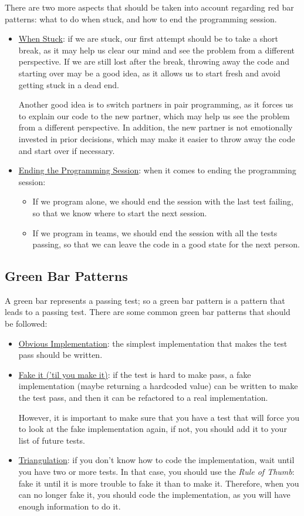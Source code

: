 There are two more aspects that should be taken into account regarding red bar patterns: what to do when stuck, and how to end the programming session.
\begin{itemize}
    \item \ul{When Stuck}: if we are stuck, our first attempt should be to take a short break, as it may help us clear our mind and see the problem from a different perspective. If we are still lost after the break, throwing away the code and starting over may be a good idea, as it allows us to start fresh and avoid getting stuck in a dead end.
    
    Another good idea is to switch partners in pair programming, as it forces us to explain our code to the new partner, which may help us see the problem from a different perspective. In addition, the new partner is not emotionally invested in prior decisions, which may make it easier to throw away the code and start over if necessary.
    
    \item \ul{Ending the Programming Session}: when it comes to ending the programming session:
    \begin{itemize}
        \item If we program alone, we should end the session with the last test failing, so that we know where to start the next session.
        \item If we program in teams, we should end the session with all the tests passing, so that we can leave the code in a good state for the next person.
    \end{itemize}
\end{itemize}

\subsection{Green Bar Patterns}

A green bar represents a passing test; so a green bar pattern is a pattern that leads to a passing test. There are some common green bar patterns that should be followed:
\begin{itemize}
    \item \ul{Obvious Implementation}: the simplest implementation that makes the test pass should be written.
    \item \ul{Fake it ('til you make it)}: if the test is hard to make pass, a fake implementation (maybe returning a hardcoded value) can be written to make the test pass, and then it can be refactored to a real implementation.
    
    However, it is important to make sure that you have a test that will force you to look at the fake implementation again, if not, you should add it to your list of future tests.
    \item \ul{Triangulation}: if you don't know how to code the implementation, wait until you have two or more tests. In that case, you should use the \emph{Rule of Thumb}: fake it until it is more trouble to fake it than to make it. Therefore, when you can no longer fake it, you should code the implementation, as you will have enough information to do it.
\end{itemize}

